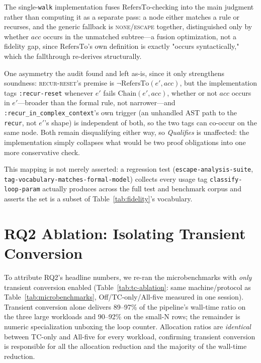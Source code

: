 \documentclass[sigplan,review,anonymous]{acmart}
\begin{document}
The single-\texttt{walk} implementation fuses $\mathrm{RefersTo}$-checking into the main judgment rather than computing it as a separate pass: a node either matches a rule or recurses, and the generic fallback is \textsc{none}/\textsc{escape} together, distinguished only by whether $acc$ occurs in the unmatched subtree---a fusion optimization, not a fidelity gap, since $\mathrm{RefersTo}$'s own definition is exactly "occurs syntactically," which the fallthrough re-derives structurally.

One asymmetry the audit found and left as-is, since it only strengthens soundness: \textsc{recur-reset}'s premise is $\neg\mathrm{RefersTo}(e',acc)$, but the implementation tags \texttt{:recur-reset} whenever $e'$ fails $\mathrm{Chain}(e',acc)$, whether or not $acc$ occurs in $e'$---broader than the formal rule, not narrower---and \texttt{:recur\_in\_complex\_context}'s own trigger (an unhandled AST path to the \texttt{recur}, not $e'$'s shape) is independent of both, so the two tags can co-occur on the same node. Both remain disqualifying either way, so \emph{Qualifies} is unaffected: the implementation simply collapses what would be two proof obligations into one more conservative check.

This mapping is not merely asserted: a regression test (\texttt{escape-analysis-suite}, \texttt{tag-vocabulary-matches-\allowbreak formal-model}) collects every usage tag \texttt{classify-loop-param} actually produces across the full test and benchmark corpus and asserts the set is a subset of Table~\ref{tab:fidelity}'s vocabulary.

\section{RQ2 Ablation: Isolating Transient Conversion}
\label{app:ablation}

To attribute RQ2's headline numbers, we re-ran the microbenchmarks with \emph{only} transient conversion enabled (Table~\ref{tab:tc-ablation}: same machine/protocol as Table~\ref{tab:microbenchmarks}, Off/TC-only/All-five measured in one session). Transient conversion alone delivers 89--97\% of the pipeline's wall-time ratio on the three large workloads and 90--92\% on the small-N rows; the remainder is numeric specialization unboxing the loop counter. Allocation ratios are \emph{identical} between TC-only and All-five for every workload, confirming transient conversion is responsible for all the allocation reduction and the majority of the wall-time reduction.
\end{document}

